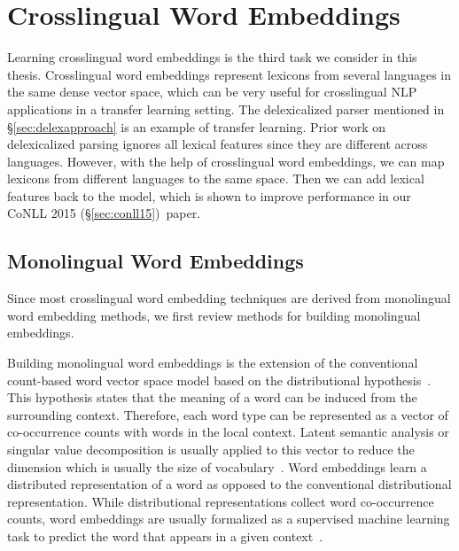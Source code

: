 \documentclass[12pt,twoside,final,hidelinks]{ltthesis}
\theoremstyle{definition}
\newcommand\conllv{CoNLL 2015 (\S\ref{sec:conll15})}
\begin{document}
\section{Crosslingual Word Embeddings}
Learning crosslingual word embeddings is the third task we consider in this thesis. Crosslingual word embeddings represent lexicons from several languages in the same dense vector space, which can be very useful for crosslingual NLP applications in a transfer learning setting. The delexicalized parser mentioned in \S\ref{sec:delexapproach}  is an example of transfer learning. Prior work on delexicalized parsing ignores all lexical features since they are different across languages. However, with the help of crosslingual word embeddings, we can map  lexicons from different languages to the same space. Then we can add lexical features back to the model, which is shown to improve  performance in our \conllv\ paper. 

\subsection{Monolingual Word Embeddings}
Since most crosslingual word embedding techniques are derived from monolingual word embedding methods, we first  review methods for building monolingual embeddings. 

Building monolingual word embeddings is the extension of the conventional count-based word vector space model based on the distributional hypothesis~\cite{Harris:54}. This hypothesis states that the meaning of a word can be induced from the surrounding context. Therefore, each word type can be represented as a vector of co-occurrence counts with words in the local context. Latent semantic analysis or singular value decomposition is usually applied to this vector to reduce the dimension which is usually the size of vocabulary~\cite{blacoe-lapata:2012:EMNLP-CoNLL,baroni-dinu-kruszewski:2014:P14-1}. Word embeddings learn a distributed representation of a word as opposed to the conventional distributional representation. While distributional representations collect word co-occurrence counts, word embeddings are usually formalized as a supervised machine learning task to predict the word that appears in a given context~\cite{Collobert:2008,mikolov-yih-zweig:2013:NAACL-HLT,Bengio:2003:NPL:944919.944966,Turian:2010:WRS:1858681.1858721,Huang:2012:IWR:2390524.2390645,pennington2014glove}.
\end{document}
